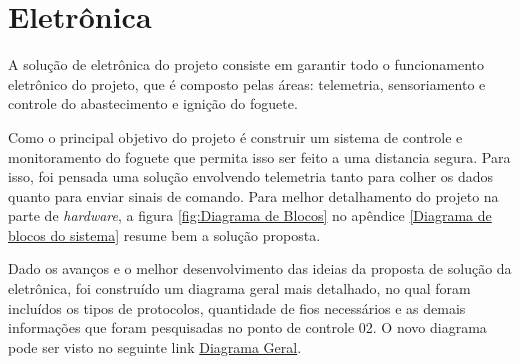 \section{Eletrônica}
\par A solução de eletrônica do projeto consiste em garantir todo o funcionamento eletrônico do projeto, que é composto pelas áreas: telemetria, sensoriamento e controle do abastecimento e ignição do foguete.
\par Como o principal objetivo do projeto é construir um sistema de controle e monitoramento do foguete que permita isso ser feito a uma distancia segura. Para isso, foi pensada uma solução envolvendo telemetria tanto para colher os dados quanto para enviar sinais de comando. Para melhor detalhamento do projeto na parte de \textit{hardware}, a figura \ref{fig:Diagrama de Blocos} no apêndice \ref{Diagrama de blocos do sistema} resume bem a solução proposta.

Dado os avanços e o melhor desenvolvimento das ideias da proposta de solução da eletrônica, foi construído um diagrama geral mais detalhado, no qual foram incluídos os tipos de protocolos, quantidade de fios necessários e as demais informações que foram pesquisadas no ponto de controle 02. O novo diagrama pode ser visto no seguinte link \href{https://drive.google.com/file/d/12-pXv5L2Z5AuyWWVIr8VZ4WMghu7SYDw/view?usp=sharing}{Diagrama Geral}.     


